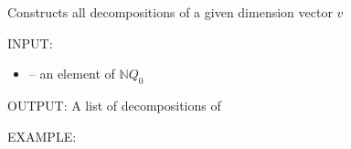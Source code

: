 \documentclass[letterpaper,10pt,english]{sphinxmanual}
\begin{document}
\begin{fulllineitems}
\label{\detokenize{index:quivercombinatorics.quivercombinatorics.Quiver.all_decompositions}}
\pysigstartsignatures
\pysiglinewithargsret
{}
{}
{}
\pysigstopsignatures
\sphinxAtStartPar
Constructs all decompositions of a given dimension vector \(v\)

\sphinxAtStartPar
INPUT:
\begin{itemize}
\item {} 
\sphinxAtStartPar
{} – an element of \(\mathbb{N}Q_0\)

\end{itemize}

\sphinxAtStartPar
OUTPUT: A list of decompositions of 

\sphinxAtStartPar
EXAMPLE:


\end{fulllineitems}
\end{document}
